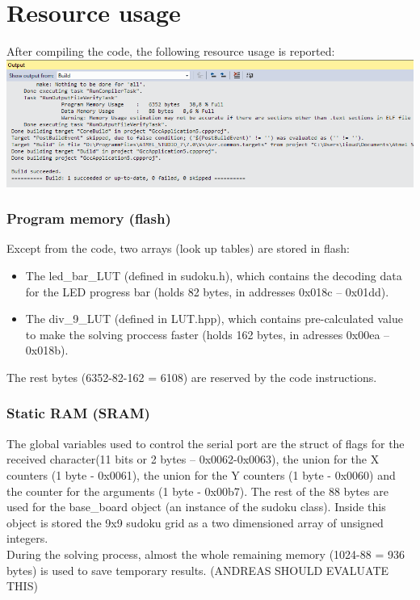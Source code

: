 \documentclass[12pt, a4]{article}
\begin{document}
\section*{Resource usage}
After compiling the code, the following resource usage is reported: \\
\includegraphics[width = \textwidth]{RESOURCES.png} 

\subsubsection*{Program memory (flash)}
Except from the code, two arrays (look up tables) are stored in flash: 
\begin{itemize}
\item The led\_bar\_LUT (defined in sudoku.h), which contains the decoding data for the LED progress bar (holds 82 bytes, in addresses 0x018c -- 0x01dd).
\item The div\_9\_LUT (defined in LUT.hpp), which contains pre-calculated value to make the solving proccess faster (holds 162 bytes, in adresses 0x00ea -- 0x018b).
\end{itemize}
The rest bytes (6352-82-162 = 6108) are reserved by the code instructions.

\subsubsection*{Static RAM (SRAM)}
The global variables used to control the serial port are the struct of flags for the received character(11 bits or 2 bytes -- 0x0062-0x0063), the union for the X counters (1 byte - 0x0061), the union for the Y counters (1 byte - 0x0060) and the counter for the arguments (1 byte - 0x00b7). The rest of the 88 bytes are used for the base\_board object (an instance of the sudoku class). Inside this object is stored the 9x9 sudoku grid as a two dimensioned array of unsigned integers. \\
During the solving process, almost the whole remaining memory (1024-88 = 936 bytes) is used to save temporary results. (ANDREAS SHOULD EVALUATE THIS)
\end{document}

